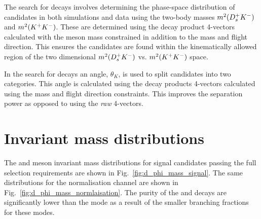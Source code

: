 The search for \decay{\Bp}{\Dsp\Kp\Km} decays involves determining the phase-space distribution of candidates in both simulations and data using the two-body masses $m^{2}({{D}^+_{s}}{{K}^-})$ and $m^{2}({{K}^+}{{K}^-})$. These are determined using the decay product 4-vectors calculated with the \Bp meson mass constrained in addition to the \Dsp mass and \Bp flight direction. This ensures the candidates are found within the kinematically allowed region of the two dimensional $m^{2}({{D}^+_{s}}{{K}^-})$ vs. $m^{2}({{K}^+}{{K}^-})$ space.

In the search for \decay{\Bp}{\Dsp\phiz} decays an angle, $\theta_{K}$, is used to split candidates into two categories. This angle is calculated using the decay products 4-vectors calculated using the \Dsp mass and \Bp flight direction constraints. This improves the separation power as opposed to using the \emph{raw} 4-vectors.  



\section{Invariant mass distributions}
\label{sec:invarinantmassdistros}


The \Dsp and \phiz meson invariant mass distributions for signal \decay{\Bp}{\Dsp\phiz} candidates passing the full selection requirements are shown in Fig.~\ref{fig:d_phi_mass_signal}. The same distributions for the normalisation channel \decay{\Bp}{\Dsp\Dzb} are shown in Fig.~\ref{fig:d_phi_mass_normlaisation}. The purity of the \decay{\Dsp}{\pip\pim\pip} and \decay{\Dsp}{\Kp\pim\pip} decays are significantly lower than the \decay{\Dsp}{\Kp\Km\pip} mode as a result of the smaller branching fractions for these modes. 


